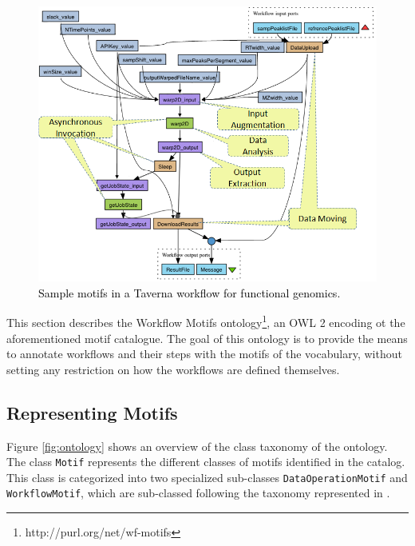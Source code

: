 \begin{figure}[ht!]
\centering
\includegraphics[scale=0.70]{Figures/taverna-wf-motifs.png}
\caption{\textcolor{black}{Sample motifs in a Taverna workflow for functional genomics.}}
\label{fig:tav_wf_motifs}
\end{figure}

This section describes the Workflow Motifs ontology\footnote{http://purl.org/net/wf-motifs}, an OWL 2 encoding ot the aforementioned motif catalogue. The goal of this ontology is to provide the means to annotate workflows and their steps with the motifs of the vocabulary, without setting any restriction on how the workflows are defined themselves.

\subsection{Representing Motifs}
Figure \ref{fig:ontology} shows an overview of the class taxonomy of the ontology. The class {\tt  Motif} represents the different classes of motifs identified in the catalog. This class is categorized into two specialized sub-classes {\tt  DataOperationMotif} and {\tt  WorkflowMotif}, which are sub-classed following the taxonomy represented in \cite{garijo_Alper_2012}.

